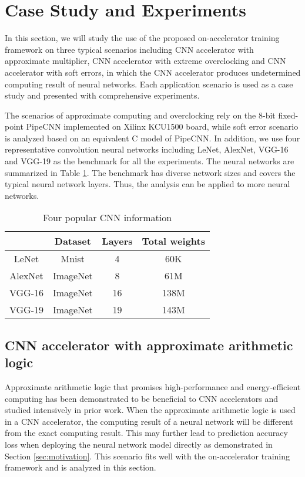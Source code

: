\section{Case Study and Experiments} \label{sec:casestudy}
In this section, we will study the use of the proposed on-accelerator training framework 
on three typical scenarios including CNN accelerator with approximate multiplier, 
CNN accelerator with extreme overclocking and CNN accelerator with soft errors, 
in which the CNN accelerator produces undetermined computing result of neural networks.
Each application scenario is used as a case study and presented with comprehensive 
experiments. 

The scenarios of approximate computing and overclocking rely on the 8-bit 
fixed-point PipeCNN \cite{pipecnn_2} implemented on Xilinx KCU1500 board, 
while soft error scenario is analyzed based on an equivalent C model of PipeCNN.  
In addition, we use four representative convolution neural networks including LeNet, 
AlexNet, VGG-16 and VGG-19 as the benchmark for all the experiments. The neural networks 
are summarized in Table \ref{tab:CNN-table}. The benchmark has diverse network sizes and 
covers the typical neural network layers. Thus, the analysis can be applied to more 
neural networks.

\begin{table}
        \centering
        \vspace{-0.3em}
        \caption{Four popular CNN information}
        \label{tab:CNN-table}
        \vspace{-0.3em}
        \begin{tabular}{c|c|c|c}
		\toprule
		  & Dataset & Layers & Total weights \\
		\midrule
		LeNet & Mnist & 4 & 60K \\
		\midrule
		AlexNet & ImageNet & 8 & 61M \\
		\midrule
		VGG-16 & ImageNet & 16 & 138M \\
		\midrule
		VGG-19 & ImageNet & 19 & 143M \\
		\bottomrule
        \end{tabular}
        \vspace{-1em}
\end{table}


\subsection{CNN accelerator with approximate arithmetic logic}
Approximate arithmetic logic that promises high-performance 
and energy-efficient computing has been demonstrated to be 
beneficial to CNN accelerators and studied intensively 
in prior work. When the approximate arithmetic logic 
is used in a CNN accelerator, the computing result of a 
neural network will be different from the exact computing result.
This may further lead to prediction accuracy loss when deploying 
the neural network model directly as demonstrated in 
Section \ref{sec:motivation}. This scenario fits well with the on-accelerator 
training framework and is analyzed in this section.

